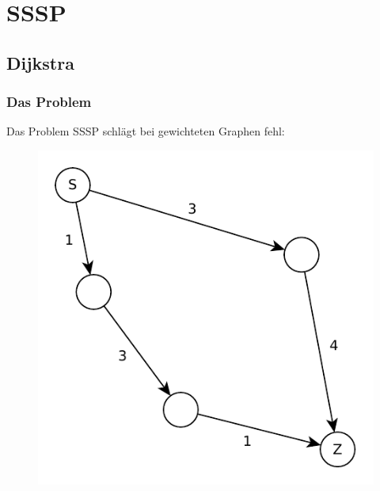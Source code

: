 \section{SSSP}
\subsection{Dijkstra}
\begin{frame}
\frametitle{Das Problem}
\begin{block}{Das Problem}
SSSP schlägt bei gewichteten Graphen fehl: 

\begin{figure}
\includegraphics[scale=.75]{dijkstra_graphs/bfs_fail_0.pdf}
\end{figure}

\end{block}
\end{frame}

